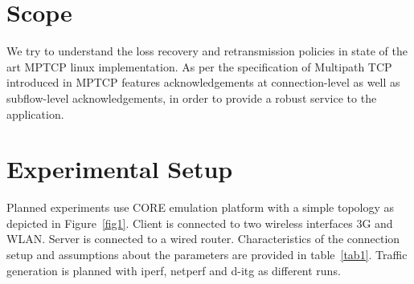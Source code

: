 \documentclass[12pt,draftcls,onecolumn]{IEEEtran}
\begin{document}
\section{Scope}\label{scope}

We try to understand the loss recovery and retransmission policies in state of the art MPTCP linux implementation. As per the specification of Multipath TCP introduced in 
MPTCP features acknowledgements at connection-level as well as
   subflow-level acknowledgements, in order to provide a robust service
   to the application.


\section{Experimental Setup}\label{exsetup}

Planned experiments use CORE emulation platform with a simple topology as depicted in Figure~\ref{fig1}.
Client is connected to two wireless interfaces 3G and WLAN. Server is connected to a wired router.
Characteristics of the connection setup and assumptions about the parameters are provided in table~\ref{tab1}.
Traffic generation is planned with iperf, netperf and d-itg as different runs. 
 
\end{document}
